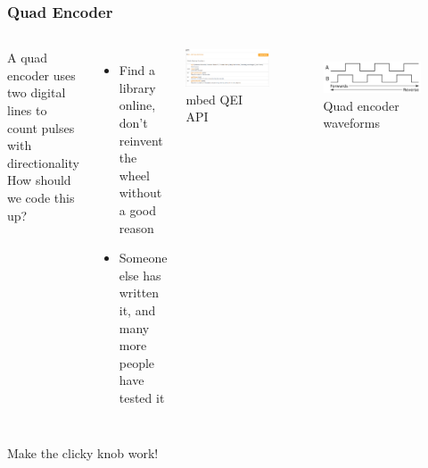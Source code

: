 \documentclass{beamer}
\begin{document}
\begin{frame}
\frametitle{Quad Encoder}
\begin{columns}[t]
  A quad encoder uses two digital lines to count pulses with directionality \\
  \hfill \break
  How should we code this up?
   {
  \begin{itemize}
    \item Find a library online, don't reinvent the wheel {\tiny without a good reason}
    \item Someone else has written it, and many more people have tested it
  \end{itemize}
  \centering
  \includegraphics[width = 0.9\columnwidth]{external/mbed-qei-api} \\
  mbed QEI API \\
  }
  \begin{figure}
    \centering
    \includegraphics[width = 0.9\columnwidth]{images/quad-encoder} \\
    Quad encoder waveforms \\

  \end{figure}
\end{columns}
\end{frame}

\begin{frame}
\centering \huge Make the clicky knob work!
\end{frame}
\end{document}

